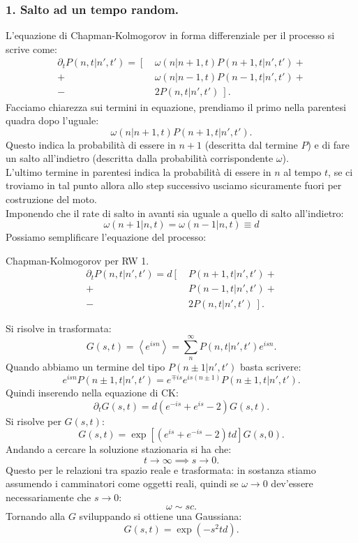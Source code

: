 \subsubsection{1. Salto ad un tempo random.}%
\label{subsub:1. Salto ad un tempo random.}
L'equazione di Chapman-Kolmogorov in forma differenziale per il processo si scrive come:
\[\begin{aligned}
    \partial_{t}P\left(n,t|n',t'\right) = \left[ \ \right.&\omega\left(n|n+1,t\right)P\left(n+1, t|n',t'\right) +\\
                                             +& \omega\left(n|n-1,t\right)P\left(n-1, t|n',t'\right) + \\
					     -& \left. 2P\left(n,t|n',t'\right) \ \right]
.\end{aligned}\]
Facciamo chiarezza sui termini in equazione, prendiamo il primo nella parentesi quadra dopo l'uguale:
\[
    \omega\left(n|n+1,t\right)P\left(n+1, t|n',t'\right)
.\] 
Questo indica la probabilità di essere in $n+1$ (descritta dal termine $P$) e di fare un salto all'indietro (descritta dalla probabilità corrispondente $\omega$).\\
L'ultimo termine in parentesi indica la probabilità di essere in $n$ al tempo $t$, se ci troviamo in tal punto allora allo step successivo usciamo sicuramente fuori per costruzione del moto.\\
Imponendo che il rate di salto in avanti sia uguale a quello di salto all'indietro:
\begin{equation}
    \omega (n+1|n,t) = \omega (n-1|n,t) \equiv d \label{6_rate}
\end{equation}
Possiamo semplificare l'equazione del processo:
\begin{bluebox}{Chapman-Kolmogorov per RW 1.}
    \begin{equation}
\begin{aligned}
    \partial_{t}P\left(n,t|n',t'\right) = d\left[ \ \right.&P\left(n+1, t|n',t'\right) +\\
                                             +& P\left(n-1, t|n',t'\right) + \\
					     -& \left. 2P\left(n,t|n',t'\right) \ \right]
					     \label{eq:RW_1}
.\end{aligned}
    \end{equation}
\end{bluebox}
\noindent
Si risolve in trasformata:
\[
    G(s,t) = \left<e^{isn}\right> = \sum_{n}^{\infty} P\left(n,t|n',t'\right)e^{isn}
.\] 
Quando abbiamo un termine del tipo $P\left(n\pm 1|n',t'\right)$ basta scrivere:
\[
    e^{isn}P\left(n\pm 1, t|n',t'\right) = e^{\mp is} e^{is(n\pm 1)}P\left(n\pm 1, t|n',t'\right)
.\] 
Quindi inserendo nella equazione di CK:
\[
    \partial_{t}G(s,t) =d\left(e^{-is}+ e^{is}-2\right)G(s,t) 
.\] 
Si risolve per $G(s,t)$:
\[
    G(s,t) = \exp \left[\left(e^{is}+e^{-is}-2\right)td\right]G(s,0) 
.\] 
Andando a cercare la soluzione stazionaria si ha che:
\[
t\to \infty \implies s\to 0
.\] 
Questo per le relazioni tra spazio reale e trasformata: in sostanza stiamo assumendo i camminatori come oggetti reali, quindi se $\omega\to 0$ dev'essere necessariamente che $s\to 0$:
\[
    \omega  \sim sc
.\] 
Tornando alla $G$ sviluppando si ottiene una Gaussiana:
\[
    G(s,t) = \exp(-s^2td) 
.\] 

